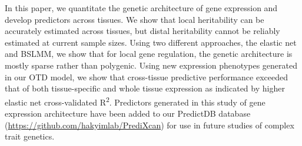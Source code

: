\documentclass[10pt,letterpaper]{article}
\begin{document}
%
%

In this paper, we quantitate the genetic architecture of gene expression and develop predictors across tissues. We show that local heritability can be accurately estimated across tissues, but distal heritability cannot be reliably estimated at current sample sizes. Using two different approaches, the elastic net and BSLMM, we show that for local gene regulation, the genetic architecture is mostly sparse rather than polygenic. Using new expression phenotypes generated in our OTD model, we show that cross-tissue predictive performance exceeded that of both tissue-specific and whole tissue expression as indicated by higher elastic net cross-validated R\textsuperscript{2}. Predictors generated in this study of gene expression architecture have been added to our PredictDB database (\url{https://github.com/hakyimlab/PrediXcan}) for use in future studies of complex trait genetics.
\end{document}
